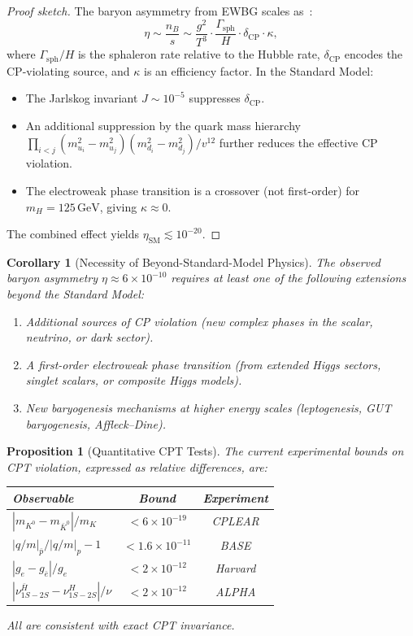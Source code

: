 \documentclass[12pt]{article}
\newtheorem{proposition}[theorem]{Proposition}
\newtheorem{corollary}[theorem]{Corollary}
\theoremstyle{definition}
\theoremstyle{remark}
\newcommand{\GeV}{\,\text{GeV}}
\begin{document}
\begin{proof}[Proof sketch]
The baryon asymmetry from EWBG scales as~\cite{ShaposhnikovReview}:
\begin{equation}
\eta \sim \frac{n_B}{s} \sim \frac{g^2}{T^3} \cdot \frac{\Gamma_{\text{sph}}}{H} \cdot \delta_{\text{CP}} \cdot \kappa,
\end{equation}
where $\Gamma_{\text{sph}}/H$ is the sphaleron rate relative to the Hubble rate,
$\delta_{\text{CP}}$ encodes the CP-violating source, and $\kappa$ is an efficiency
factor. In the Standard Model:
\begin{itemize}
    \item The Jarlskog invariant $J \sim 10^{-5}$ suppresses $\delta_{\text{CP}}$.
    \item An additional suppression by the quark mass hierarchy
    $\prod_{i<j}(m_{u_i}^2 - m_{u_j}^2)(m_{d_i}^2 - m_{d_j}^2)/v^{12}$ further
    reduces the effective CP violation.
    \item The electroweak phase transition is a crossover (not first-order) for
    $m_H = 125\GeV$, giving $\kappa \approx 0$.
\end{itemize}
The combined effect yields $\eta_{\text{SM}} \lesssim 10^{-20}$.
\end{proof}

\begin{corollary}[Necessity of Beyond-Standard-Model Physics]
\label{cor:bsm}
The observed baryon asymmetry $\eta \approx 6 \times 10^{-10}$ requires at least one
of the following extensions beyond the Standard Model:
\begin{enumerate}
    \item Additional sources of CP violation (new complex phases in the scalar,
    neutrino, or dark sector).
    \item A first-order electroweak phase transition (from extended Higgs sectors,
    singlet scalars, or composite Higgs models).
    \item New baryogenesis mechanisms at higher energy scales (leptogenesis,
    GUT baryogenesis, Affleck--Dine).
\end{enumerate}
\end{corollary}

\begin{proposition}[Quantitative CPT Tests]
\label{prop:cpt_tests}
The current experimental bounds on CPT violation, expressed as relative differences,
are:
\begin{center}
\begin{tabular}{lcc}
\hline
Observable & Bound & Experiment \\
\hline
$|m_{K^0} - m_{\bar{K}^0}|/m_K$ & $< 6 \times 10^{-19}$ & CPLEAR \\
$|q/m|_{\bar{p}} / |q/m|_p - 1$ & $< 1.6 \times 10^{-11}$ & BASE \\
$|g_e - g_{\bar{e}}|/g_e$ & $< 2 \times 10^{-12}$ & Harvard \\
$|\nu_{1S-2S}^{\bar{H}} - \nu_{1S-2S}^{H}|/\nu$ & $< 2 \times 10^{-12}$ & ALPHA \\
\hline
\end{tabular}
\end{center}
All are consistent with exact CPT invariance.
\end{proposition}
\end{document}
